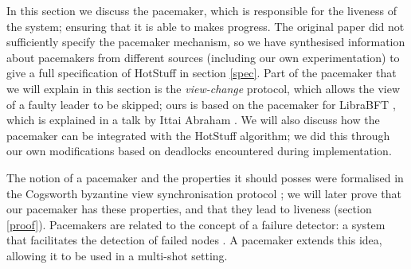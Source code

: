 In this section we discuss the pacemaker, which is responsible for the liveness of the system; ensuring that it is able to makes progress. The original paper did not sufficiently specify the pacemaker mechanism, so we have synthesised information about pacemakers from different sources (including our own experimentation) to give a full specification of HotStuff in section \ref{spec}. Part of the pacemaker that we will explain in this section is the \textit{view-change} protocol, which allows the view of a faulty leader to be skipped; ours is based on the pacemaker for LibraBFT \cite{baudet_state_nodate}, which is explained in a talk by Ittai Abraham \cite{ittai}. We will also discuss how the pacemaker can be integrated with the HotStuff algorithm; we did this through our own modifications based on deadlocks encountered during implementation.


The notion of a pacemaker and the properties it should posses were formalised in the Cogsworth byzantine view synchronisation protocol \cite{naor_cogsworth_2020}; we will later prove that our pacemaker has these properties, and that they lead to liveness (section \ref{proof}). Pacemakers are related to the concept of a failure detector: a system that facilitates the detection of failed nodes \cite{chandra_weakest_1996}\cite{chandra_unreliable_1996}. A pacemaker extends this idea, allowing it to be used in a multi-shot setting.


